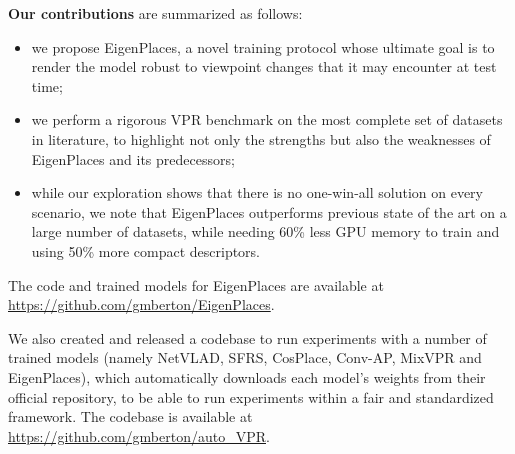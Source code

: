 \documentclass[10pt,twocolumn,letterpaper]{article}
\newcommand{\myparagraph}[1]{\vspace{4pt}\noindent\textbf{#1}}
\begin{document}
\myparagraph{Our contributions} are summarized as follows:
\begin{itemize}\item we propose EigenPlaces, a novel training protocol whose ultimate goal is to render the model robust to viewpoint changes that it may encounter at test time;
    \item we perform a rigorous VPR benchmark on the most complete set of datasets in literature, to highlight not only the strengths but also the weaknesses of EigenPlaces and its predecessors;
    \item while our exploration shows that there is no one-win-all solution on every scenario, we note that EigenPlaces outperforms previous state of the art on a large number of datasets, while needing 60\% less GPU memory to train and using 50\% more compact descriptors.
\end{itemize}



The code and trained models for EigenPlaces are available at {\small{\url{https://github.com/gmberton/EigenPlaces}}}.

We also created and released a codebase to run experiments with a number of trained models (namely NetVLAD, SFRS, CosPlace, Conv-AP, MixVPR and EigenPlaces), which automatically downloads each model's weights from their official repository, to be able to run experiments within a fair and standardized framework.
The codebase is available at {\small{\url{https://github.com/gmberton/auto_VPR}}}.






 
\end{document}
